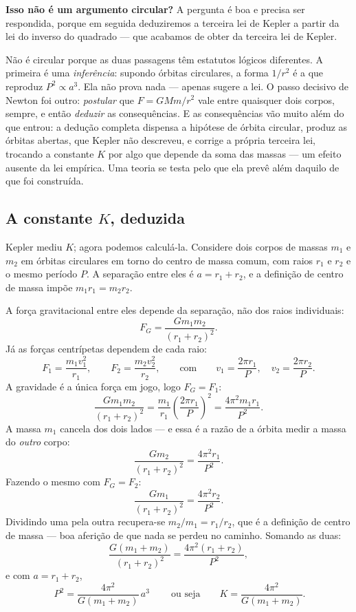\documentclass[11pt,a4paper]{article}
\begin{document}
\begin{noticebox}
\textbf{Isso não é um argumento circular?} A pergunta é boa e precisa ser respondida, porque em seguida
deduziremos a terceira lei de Kepler a partir da lei do inverso do quadrado --- que acabamos de obter da
terceira lei de Kepler.

Não é circular porque as duas passagens têm estatutos lógicos diferentes. A primeira é uma \emph{inferência}:
supondo órbitas circulares, a forma $1/r^{2}$ é a que reproduz $P^{2}\propto a^{3}$. Ela não prova nada ---
apenas sugere a lei. O passo decisivo de Newton foi outro: \emph{postular} que $F=GMm/r^{2}$ vale entre
quaisquer dois corpos, sempre, e então \emph{deduzir} as consequências. E as consequências vão muito além do
que entrou: a dedução completa dispensa a hipótese de órbita circular, produz as órbitas abertas, que Kepler
não descreveu, e corrige a própria terceira lei, trocando a constante $K$ por algo que depende da soma das
massas --- um efeito ausente da lei empírica. Uma teoria se testa pelo que ela prevê além daquilo de que foi
construída.
\end{noticebox}

\subsection*{A constante $K$, deduzida}

Kepler mediu $K$; agora podemos calculá-la. Considere dois corpos de massas $m_1$ e $m_2$ em órbitas
circulares em torno do centro de massa comum, com raios $r_1$ e $r_2$ e o mesmo período $P$. A separação entre
eles é $a=r_1+r_2$, e a definição de centro de massa impõe $m_1r_1=m_2r_2$.

A força gravitacional entre eles depende da separação, não dos raios individuais:
\[
F_G=\frac{Gm_1m_2}{(r_1+r_2)^{2}}.
\]
Já as forças centrípetas dependem de cada raio:
\[
F_1=\frac{m_1v_1^{2}}{r_1},
\qquad
F_2=\frac{m_2v_2^{2}}{r_2},
\qquad\text{com}\qquad
v_1=\frac{2\pi r_1}{P},
\quad
v_2=\frac{2\pi r_2}{P}.
\]
A gravidade é a única força em jogo, logo $F_G=F_1$:
\[
\frac{Gm_1m_2}{(r_1+r_2)^{2}}=\frac{m_1}{r_1}\left(\frac{2\pi r_1}{P}\right)^{2}
=\frac{4\pi^{2}m_1r_1}{P^{2}}.
\]
A massa $m_1$ cancela dos dois lados --- e essa é a razão de a órbita medir a massa do \emph{outro} corpo:
\[
\frac{Gm_2}{(r_1+r_2)^{2}}=\frac{4\pi^{2}r_1}{P^{2}}.
\]
Fazendo o mesmo com $F_G=F_2$:
\[
\frac{Gm_1}{(r_1+r_2)^{2}}=\frac{4\pi^{2}r_2}{P^{2}}.
\]
Dividindo uma pela outra recupera-se $m_2/m_1=r_1/r_2$, que é a definição de centro de massa --- boa aferição
de que nada se perdeu no caminho. Somando as duas:
\[
\frac{G(m_1+m_2)}{(r_1+r_2)^{2}}=\frac{4\pi^{2}(r_1+r_2)}{P^{2}},
\]
e com $a=r_1+r_2$,
\[
\boxed{\ P^{2}=\frac{4\pi^{2}}{G(m_1+m_2)}\,a^{3}\ }
\qquad\text{ou seja}\qquad
K=\frac{4\pi^{2}}{G(m_1+m_2)}.
\]
\end{document}
